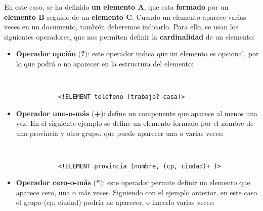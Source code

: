 En este caso, se ha definido \textbf{un elemento A}, que esta \textbf{formado} por un \textbf{elemento B} seguido de un \textbf{elemento C}. Cuando un elemento aparece varias veces en un documento, también deberemos indicarlo. Para ello, se usan los siguientes operadores, que nos permiten definir la \textbf{cardinalidad} de un elemento:

\begin{itemize}
    \item \textbf{Operador opción} (\textbf{?}): este operador indica que un elemento es opcional, por lo que podrá o no aparecer en la estructura del elemento:

    \begin{figure}[H]
        \begin{tcolorbox}[sharp corners, colback=yellow!30, colframe=white!20]
            \scriptsize
            \begin{verbatim}


      <!ELEMENT telefono (trabajo? casa)>
            \end{verbatim}
        \end{tcolorbox}
    \end{figure}

    \item \textbf{Operador uno-o-más} (\textbf{+}): define un componente que aparece al menos una vez. En el siguiente ejemplo se define un elemento formado por el nombre de una provincia y otro grupo, que puede aparecer una o varias veces:

      \begin{figure}[H]
        \begin{tcolorbox}[sharp corners, colback=yellow!30, colframe=white!20]
            \scriptsize
            \begin{verbatim}


      <!ELEMENT provincia (nombre, (cp, ciudad)+ )>
            \end{verbatim}
        \end{tcolorbox}
    \end{figure}

    \item \textbf{Operador cero-o-más} (\textbf{*}): este operador permite definir un elemento que aparece cero, una o más veces. Siguiendo con el ejemplo anterior, en este caso el grupo (cp, ciudad) podría no aparecer, o hacerlo varias veces:

    \begin{figure}[H]
        \begin{tcolorbox}[sharp corners, colback=yellow!30, colframe=white!20]
            \scriptsize
            \begin{verbatim}



\end{verbatim}
\end{tcolorbox}
\end{figure}
\end{itemize}
